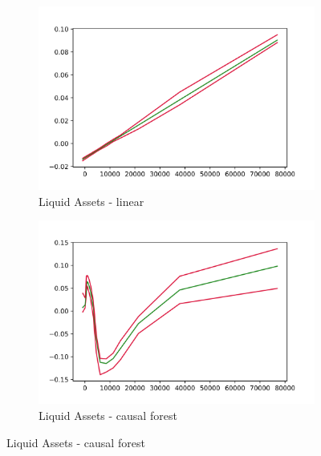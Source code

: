 \begin{figure}[h]
    \centering
    \begin{subfigure}{0.5\linewidth}
        \includegraphics[width=\linewidth]{figures/ALE/chSNDexp/spec3_linear_liqassii.png}
        \caption{Liquid Assets - linear}
    \end{subfigure}%
    \begin{subfigure}{0.5\linewidth}
        \includegraphics[width=\linewidth]{figures/ALE/chSNDexp/spec3_cf_liqassii.png}
        \caption{Liquid Assets - causal forest}
    \end{subfigure}


\end{figure}

